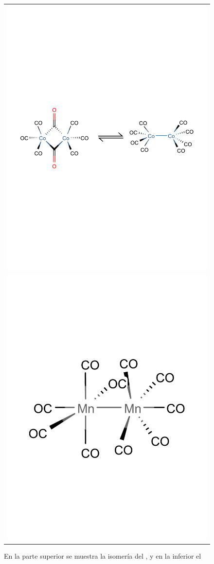 \documentclass[fleqn,10pt]{SelfArx} %
\begin{document}
	\begin{figure}[h]
	    \centering
	    \begin{tabular}{c}
	        \includegraphics[width=\linewidth]{images/dicobalt.pdf} \\ \includegraphics[width=0.5\linewidth]{images/dimanganese.pdf}
	    \end{tabular}
	    \caption{En la parte superior se muestra la isomer\'ia del , y en la inferior el }
	    \label{fig: dinucleares}
	\end{figure}
	
\end{document}

